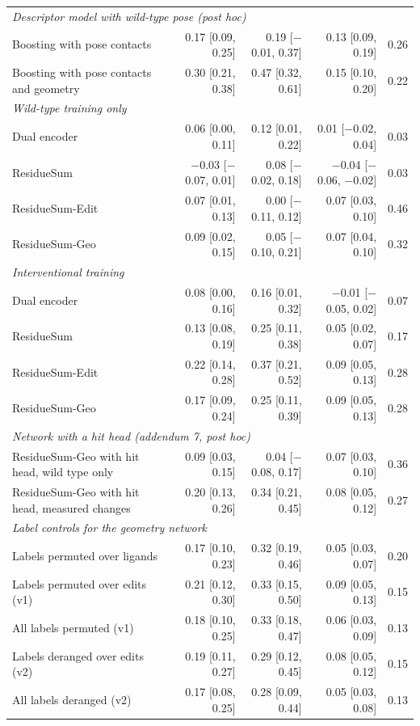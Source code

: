\begin{longtable}{p{4.6cm}rrrr}
\multicolumn{5}{l}{\emph{Descriptor model with wild-type pose (post hoc)}} \\
\quad Boosting with pose contacts & 0.17 [0.09, 0.25] & 0.19 [$-$0.01, 0.37] & 0.13 [0.09, 0.19] & 0.26 \\
\quad Boosting with pose contacts and geometry & 0.30 [0.21, 0.38] & 0.47 [0.32, 0.61] & 0.15 [0.10, 0.20] & 0.22 \\
\multicolumn{5}{l}{\emph{Wild-type training only}} \\
\quad Dual encoder & 0.06 [0.00, 0.11] & 0.12 [0.01, 0.22] & 0.01 [$-$0.02, 0.04] & 0.03 \\
\quad ResidueSum & $-$0.03 [$-$0.07, 0.01] & 0.08 [$-$0.02, 0.18] & $-$0.04 [$-$0.06, $-$0.02] & 0.03 \\
\quad ResidueSum-Edit & 0.07 [0.01, 0.13] & 0.00 [$-$0.11, 0.12] & 0.07 [0.03, 0.10] & 0.46 \\
\quad ResidueSum-Geo & 0.09 [0.02, 0.15] & 0.05 [$-$0.10, 0.21] & 0.07 [0.04, 0.10] & 0.32 \\
\multicolumn{5}{l}{\emph{Interventional training}} \\
\quad Dual encoder & 0.08 [0.00, 0.16] & 0.16 [0.01, 0.32] & $-$0.01 [$-$0.05, 0.02] & 0.07 \\
\quad ResidueSum & 0.13 [0.08, 0.19] & 0.25 [0.11, 0.38] & 0.05 [0.02, 0.07] & 0.17 \\
\quad ResidueSum-Edit & 0.22 [0.14, 0.28] & 0.37 [0.21, 0.52] & 0.09 [0.05, 0.13] & 0.28 \\
\quad ResidueSum-Geo & 0.17 [0.09, 0.24] & 0.25 [0.11, 0.39] & 0.09 [0.05, 0.13] & 0.28 \\
\multicolumn{5}{l}{\emph{Network with a hit head (addendum 7, post hoc)}} \\
\quad ResidueSum-Geo with hit head, wild type only & 0.09 [0.03, 0.15] & 0.04 [$-$0.08, 0.17] & 0.07 [0.03, 0.10] & 0.36 \\
\quad ResidueSum-Geo with hit head, measured changes & 0.20 [0.13, 0.26] & 0.34 [0.21, 0.45] & 0.08 [0.05, 0.12] & 0.27 \\
\multicolumn{5}{l}{\emph{Label controls for the geometry network}} \\
\quad Labels permuted over ligands & 0.17 [0.10, 0.23] & 0.32 [0.19, 0.46] & 0.05 [0.03, 0.07] & 0.20 \\
\quad Labels permuted over edits (v1) & 0.21 [0.12, 0.30] & 0.33 [0.15, 0.50] & 0.09 [0.05, 0.13] & 0.15 \\
\quad All labels permuted (v1) & 0.18 [0.10, 0.25] & 0.33 [0.18, 0.47] & 0.06 [0.03, 0.09] & 0.13 \\
\quad Labels deranged over edits (v2) & 0.19 [0.11, 0.27] & 0.29 [0.12, 0.45] & 0.08 [0.05, 0.12] & 0.15 \\
\quad All labels deranged (v2) & 0.17 [0.08, 0.25] & 0.28 [0.09, 0.44] & 0.05 [0.03, 0.08] & 0.13 \\
\bottomrule
\end{longtable}
